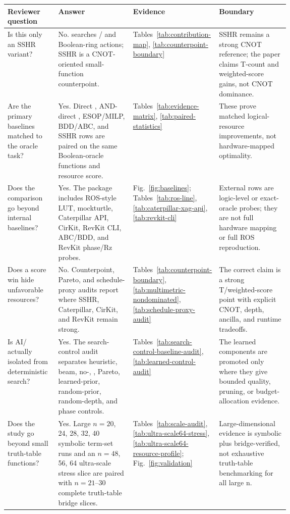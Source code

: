 \begin{tabularx}{\linewidth}{>{\raggedright\arraybackslash}p{0.18\linewidth}>{\raggedright\arraybackslash}X>{\raggedright\arraybackslash}p{0.22\linewidth}>{\raggedright\arraybackslash}p{0.25\linewidth}}
\toprule
Reviewer question & Answer & Evidence & Boundary \\
\midrule
Is this only an SSHR variant? & No. \method{} searches \anf{}/\fprm{} and Boolean-ring actions; SSHR is a CNOT-oriented small-function counterpoint. & Tables~\ref{tab:contribution-map}, \ref{tab:counterpoint-boundary} & SSHR remains a strong CNOT reference; the paper claims T-count and weighted-score gains, not CNOT dominance. \\
Are the primary baselines matched to the oracle task? & Yes. Direct \anf{}, AND-direct \anf{}, ESOP/MILP, BDD/ABC, and SSHR rows are paired on the same Boolean-oracle functions and resource score. & Tables~\ref{tab:evidence-matrix}, \ref{tab:paired-statistics} & These prove matched logical-resource improvements, not hardware-mapped optimality. \\
Does the comparison go beyond internal baselines? & Yes. The package includes ROS-style LUT, mockturtle, Caterpillar API, CirKit, RevKit CLI, ABC/BDD, and RevKit phase/Rz probes. & Fig.~\ref{fig:baselines}; Tables~\ref{tab:ros-line}, \ref{tab:caterpillar-xag-api}, \ref{tab:revkit-cli} & External rows are logic-level or exact-oracle probes; they are not full hardware mapping or full ROS reproduction. \\
Does a score win hide unfavorable resources? & No. Counterpoint, Pareto, and schedule-proxy audits report where SSHR, Caterpillar, CirKit, and RevKit remain strong. & Tables~\ref{tab:counterpoint-boundary}, \ref{tab:multimetric-nondominated}, \ref{tab:schedule-proxy-audit} & The correct claim is a strong T/weighted-score point with explicit CNOT, depth, ancilla, and runtime tradeoffs. \\
Is AI/\mcts{} actually isolated from deterministic search? & Yes. The search-control audit separates heuristic, beam, no-\mcts{}, \mcts{}, Pareto, learned-prior, random-prior, random-depth, and phase controls. & Tables~\ref{tab:search-control-baseline-audit}, \ref{tab:learned-control-audit} & The learned components are promoted only where they give bounded quality, pruning, or budget-allocation evidence. \\
Does the study go beyond small truth-table functions? & Yes. Large $n=20$, 24, 28, 32, 40 symbolic term-set runs and an $n=48$, 56, 64 ultra-scale stress slice are paired with $n=21$--$30$ complete truth-table bridge slices. & Tables~\ref{tab:scale-audit}, \ref{tab:ultra-scale64-stress}, \ref{tab:ultra-scale64-resource-profile}; Fig.~\ref{fig:validation} & Large-dimensional evidence is symbolic plus bridge-verified, not exhaustive truth-table benchmarking for all large n. \\
\bottomrule
\end{tabularx}
